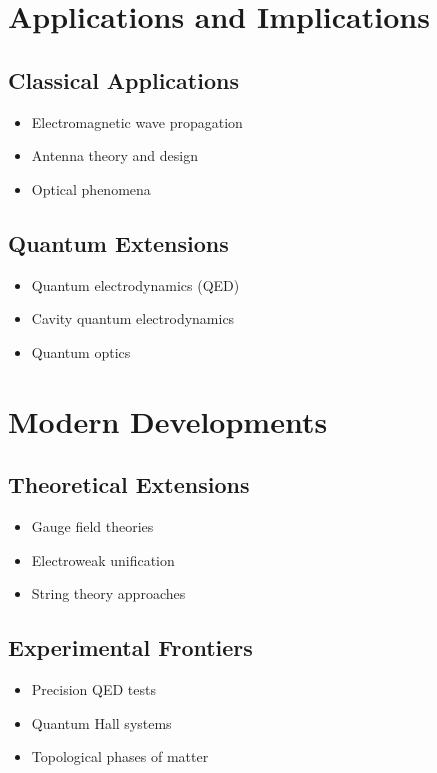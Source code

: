 \documentclass[12pt,a4paper]{article}
\begin{document}
	\section{Applications and Implications}
	\subsection{Classical Applications}
	\begin{itemize}
		\item Electromagnetic wave propagation
		\item Antenna theory and design
		\item Optical phenomena
	\end{itemize}
	
	\subsection{Quantum Extensions}
	\begin{itemize}
		\item Quantum electrodynamics (QED)
		\item Cavity quantum electrodynamics
		\item Quantum optics
	\end{itemize}
	
	\section{Modern Developments}
	\subsection{Theoretical Extensions}
	\begin{itemize}
		\item Gauge field theories
		\item Electroweak unification
		\item String theory approaches
	\end{itemize}
	
	\subsection{Experimental Frontiers}
	\begin{itemize}
		\item Precision QED tests
		\item Quantum Hall systems
		\item Topological phases of matter
	\end{itemize}
	
\end{document}
